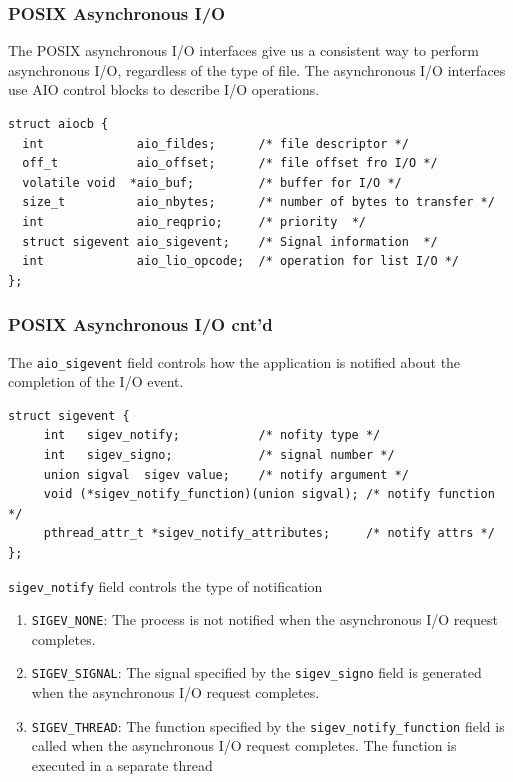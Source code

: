 \documentclass[newPxFont,sthlmFooter,nooffset]{beamer}
\begin{document}
\begin{frame}[fragile,t]
  \frametitle{POSIX Asynchronous I/O}
The POSIX asynchronous I/O interfaces give us a consistent way to perform asynchronous I/O, regardless of the type of file.
\bigskip
The asynchronous I/O interfaces use AIO control blocks to describe I/O operations.

\begin{verbatim}
struct aiocb {
  int             aio_fildes;      /* file descriptor */
  off_t           aio_offset;      /* file offset fro I/O */
  volatile void  *aio_buf;         /* buffer for I/O */
  size_t          aio_nbytes;      /* number of bytes to transfer */
  int             aio_reqprio;     /* priority  */
  struct sigevent aio_sigevent;    /* Signal information  */
  int             aio_lio_opcode;  /* operation for list I/O */
};
\end{verbatim}
\end{frame}

\begin{frame}[fragile,t]
  \frametitle{POSIX Asynchronous I/O cnt'd}
The \texttt{aio\_sigevent} field controls how the application is notified about the completion of the I/O event.
{\footnotesize
\begin{verbatim}
struct sigevent {
     int   sigev_notify;           /* nofity type */
     int   sigev_signo;            /* signal number */
     union sigval  sigev value;    /* notify argument */
     void (*sigev_notify_function)(union sigval); /* notify function */
     pthread_attr_t *sigev_notify_attributes;     /* notify attrs */
};
\end{verbatim}

\texttt{sigev\_notify} field controls the type of notification
\begin{enumerate}
\item \texttt{SIGEV\_NONE}: The process is not notified when the asynchronous I/O request completes.
\item \texttt{SIGEV\_SIGNAL}: The signal specified by the \texttt{sigev\_signo} field is generated when the asynchronous I/O request completes. 
\item \texttt{SIGEV\_THREAD}: The function specified by the \texttt{sigev\_notify\_function} field is called when the asynchronous I/O request completes. The function is executed in a separate thread
\end{enumerate}
}
\end{frame}
\end{document}

